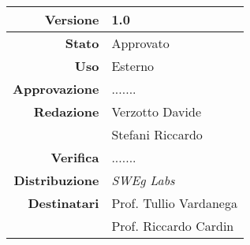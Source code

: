 \begin{center}
\begin{tabular}{r|l}
    \textbf{Versione} & 1.0 \\
    \hline
    \textbf{Stato} & Approvato \\
    \hline
    \textbf{Uso} & Esterno \\
    \hline
    \textbf{Approvazione} & ....... \\
    \hline
    \textbf{Redazione} & Verzotto Davide \\
                       & Stefani Riccardo \\
    \hline
    \textbf{Verifica} & ....... \\
    \hline
    \textbf{Distribuzione} & \emph{SWEg Labs} \\
    \hline
    \textbf{Destinatari} & Prof. Tullio Vardanega \\
                         & Prof. Riccardo Cardin \\
\end{tabular}
\end{center}
